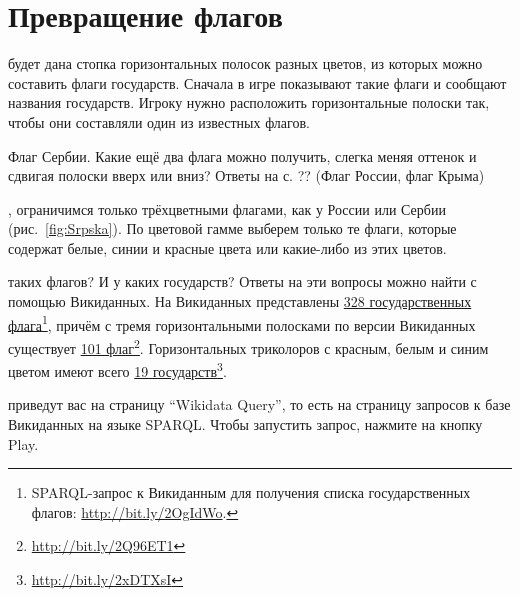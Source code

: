 \chapter{Превращение флагов}
\label{ch:draughts-moves}

 будет дана стопка горизонтальных полосок разных цветов, 
из которых можно составить флаги государств. Сначала в игре показывают такие флаги и сообщают названия государств.
Игроку нужно расположить горизонтальные полоски так, чтобы они составляли один из известных флагов. 

\begin{marginfigure}
{%
\setlength{\fboxsep}{0pt}%
\setlength{\fboxrule}{1pt}%
%
}%

\caption{Флаг Сербии. Какие ещё два флага можно получить, слегка меняя оттенок 
    и сдвигая полоски вверх или вниз? Ответы на с. ?? (Флаг России, флаг Крыма)}
\label{fig:Srpska}
\end{marginfigure}

, ограничимся только трёхцветными флагами, как у России 
или Сербии (рис.~\ref{fig:Srpska}).
По цветовой гамме выберем только те флаги, которые содержат белые, синии и красные цвета или какие-либо из этих цветов.

 таких флагов? И у каких государств? Ответы на эти вопросы 
можно найти с помощью Викиданных. 
На Викиданных представлены \href{http://bit.ly/2OgIdWo}{328 государственных флага}\footnote{
    SPARQL-запрос к Викиданным для получения списка государственных флагов: \url{http://bit.ly/2OgIdWo}.
}, 
причём с тремя горизонтальными полосками по версии Викиданных существует \href{http://bit.ly/2Q96ET1}{101 флаг}\footnote{
    \url{http://bit.ly/2Q96ET1}
}. 
Горизонтальных триколоров с красным, белым и синим цветом имеют всего \href{http://bit.ly/2xDTXsI}{19 государств}\footnote{
    \url{http://bit.ly/2xDTXsI}
}. 

 приведут вас на страницу ``Wikidata Query'', то есть на страницу запросов к базе Викиданных на языке SPARQL. Чтобы запустить запрос, нажмите на кнопку Play.
